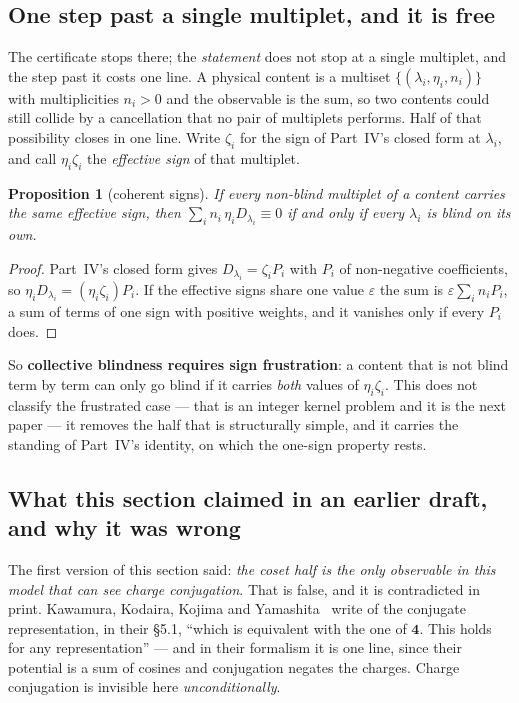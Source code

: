 \documentclass[11pt,a4paper]{article}
\newtheorem{proposition}{Proposition}
\begin{document}
\subsection*{One step past a single multiplet, and it is free}

The certificate stops there; the \emph{statement} does not stop at a single multiplet, and the step
past it costs one line. A physical content is a multiset $\{(\lambda_i,\eta_i,n_i)\}$
with multiplicities $n_i>0$ and the observable is the sum, so two contents could still collide by a
cancellation that no pair of multiplets performs. Half of that possibility closes in one line. Write
$\zeta_i$ for the sign of Part~IV's closed form at $\lambda_i$, and call $\eta_i\zeta_i$ the
\emph{effective sign} of that multiplet.

\begin{proposition}[coherent signs]\label{prop:frust}
If every non-blind multiplet of a content carries the same effective sign, then
$\sum_i n_i\,\eta_i D_{\lambda_i}\equiv0$ if and only if every $\lambda_i$ is blind on its own.
\end{proposition}

\begin{proof}
Part~IV's closed form gives $D_{\lambda_i}=\zeta_i P_i$ with $P_i$ of non-negative coefficients, so
$\eta_iD_{\lambda_i}=(\eta_i\zeta_i)P_i$. If the effective signs share one value $\varepsilon$ the
sum is $\varepsilon\sum_i n_iP_i$, a sum of terms of one sign with positive weights, and it vanishes
only if every $P_i$ does.
\end{proof}

\noindent So \textbf{collective blindness requires sign frustration}: a content that is not blind
term by term can only go blind if it carries \emph{both} values of $\eta_i\zeta_i$. This does not
classify the frustrated case --- that is an integer kernel problem and it is the next paper --- it
removes the half that is structurally simple, and it carries the standing of Part~IV's identity, on
which the one-sign property rests.

\subsection*{What this section claimed in an earlier draft, and why it was wrong}

The first version of this section said: \emph{the coset half is the only observable in this model
that can see charge conjugation}. That is false, and it is contradicted in print. Kawamura, Kodaira,
Kojima and Yamashita~\cite{KKKY} write of the conjugate representation, in their \S5.1, ``which is
equivalent with the one of $\mathbf 4$. This holds for any representation'' --- and in their
formalism it is one line, since their potential is a sum of cosines and conjugation negates the
charges. Charge conjugation is invisible here \emph{unconditionally}.
\end{document}
